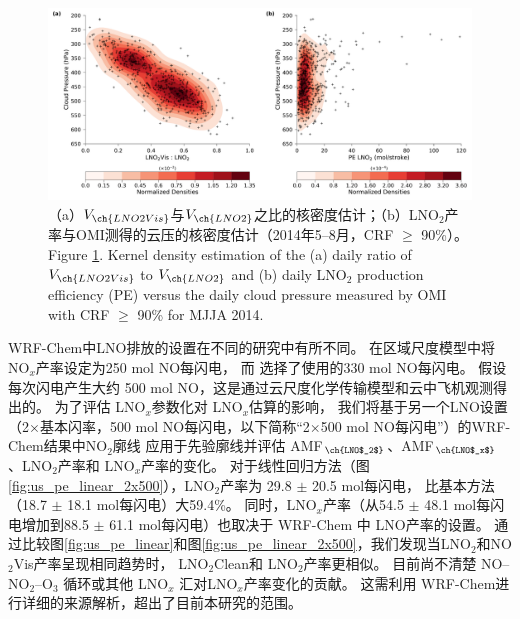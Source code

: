 \begin{figure}[!htbp]
\centering
\includegraphics[width=16cm]{./figures/us_cp_ratio_lno2.png}
\caption{（a）$V_{\ch{LNO2Vis}}$与$V_{\ch{LNO2}}$之比的核密度估计；（b）LNO$_2$产率与OMI测得的云压的核密度估计（2014年5--8月，CRF $\geq$ 90\%）。\\
Figure \ref{fig:us_cp_ratio_lno2}. Kernel density estimation of the (a) daily ratio of $V_{\ch{LNO2Vis}}$ to $V_{\ch{LNO2}}$ and (b) daily LNO$_2$ production efficiency (PE) versus the daily cloud pressure measured by OMI with CRF $\geq$ 90\% for MJJA 2014.}
\label{fig:us_cp_ratio_lno2}
\end{figure}


WRF-Chem中LNO排放的设置在不同的研究中有所不同。
\citet{Zhao.2009}在区域尺度模型中将NO$_x$产率设定为250 mol NO每闪电，
而 \citet{Bela.2016}选择了\citet{Barth.2012}使用的330 mol NO每闪电。
\citet{Wang.2015a}假设每次闪电产生大约 500 mol NO，这是通过云尺度化学传输模型和云中飞机观测得出的\citep{Ott.2010}。
为了评估 LNO$_x$参数化对 LNO$_x$估算的影响，
我们将基于另一个LNO设置（2$\times$基本闪率，500 mol NO每闪电，以下简称“2$\times$500 mol NO每闪电”）的WRF-Chem结果中NO$_2$廓线
应用于先验廓线并评估 AMF$_{\ch{LNO$_2$}}$、AMF$_{\ch{LNO$_x$}}$、LNO$_2$产率和 LNO$_x$产率的变化。
对于线性回归方法（图 \ref{fig:us_pe_linear_2x500}），LNO$_2$产率为 29.8 $\pm$ 20.5 mol每闪电，
比基本方法（18.7 $\pm$ 18.1 mol每闪电）大59.4\%。
同时，LNO$_x$产率（从54.5 $\pm$ 48.1 mol每闪电增加到88.5 $\pm$ 61.1 mol每闪电）也取决于 WRF-Chem 中 LNO产率的设置。
通过比较图\ref{fig:us_pe_linear}和图\ref{fig:us_pe_linear_2x500}，我们发现当LNO$_2$和NO$_2$Vis产率呈现相同趋势时，
LNO$_2$Clean和 LNO$_2$产率更相似。
目前尚不清楚 NO--NO$_2$--O$_3$ 循环或其他 LNO$_x$ 汇对LNO$_x$产率变化的贡献。
这需利用 WRF-Chem进行详细的来源解析，超出了目前本研究的范围。

